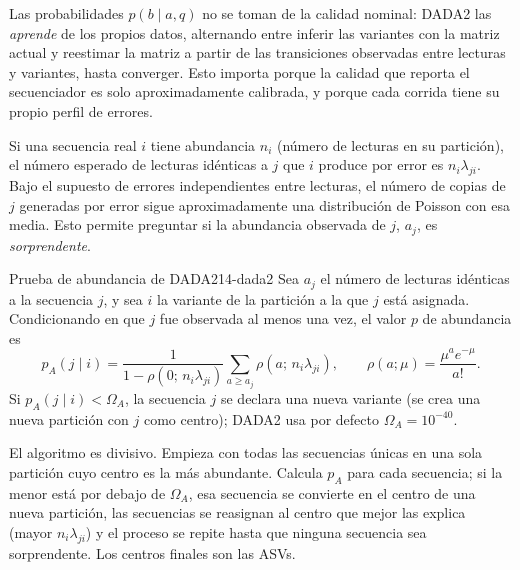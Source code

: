 Las probabilidades $p(b\mid a, q)$ no se toman de la calidad nominal: DADA2 las \emph{aprende} de los propios datos, alternando entre inferir las variantes con la matriz actual y reestimar la matriz a partir de las transiciones observadas entre lecturas y variantes, hasta converger. Esto importa porque la calidad que reporta el secuenciador es solo aproximadamente calibrada, y porque cada corrida tiene su propio perfil de errores.

Si una secuencia real $i$ tiene abundancia $n_i$ (número de lecturas en su partición), el número esperado de lecturas idénticas a $j$ que $i$ produce por error es $n_i\lambda_{ji}$. Bajo el supuesto de errores independientes entre lecturas, el número de copias de $j$ generadas por error sigue aproximadamente una distribución de Poisson con esa media. Esto permite preguntar si la abundancia observada de $j$, $a_j$, es \emph{sorprendente}.

\begin{teorema}{Prueba de abundancia de DADA2}{14-dada2}
Sea $a_j$ el número de lecturas idénticas a la secuencia $j$, y sea $i$ la variante de la partición a la que $j$ está asignada. Condicionando en que $j$ fue observada al menos una vez, el valor $p$ de abundancia es
\begin{equation}\label{eq:14-pabund}
p_A(j \mid i) = \frac{1}{1 - \rho(0;\, n_i\lambda_{ji})}\sum_{a \ge a_j} \rho(a;\, n_i\lambda_{ji}),
\qquad \rho(a;\mu) = \frac{\mu^a e^{-\mu}}{a!}.
\end{equation}
Si $p_A(j\mid i) < \Omega_A$, la secuencia $j$ se declara una nueva variante (se crea una nueva partición con $j$ como centro); DADA2 usa por defecto $\Omega_A = 10^{-40}$.
\end{teorema}

\begin{simbolos}
\end{simbolos}

El algoritmo es divisivo. Empieza con todas las secuencias únicas en una sola partición cuyo centro es la más abundante. Calcula $p_A$ para cada secuencia; si la menor está por debajo de $\Omega_A$, esa secuencia se convierte en el centro de una nueva partición, las secuencias se reasignan al centro que mejor las explica (mayor $n_i\lambda_{ji}$) y el proceso se repite hasta que ninguna secuencia sea sorprendente. Los centros finales son las ASVs.

